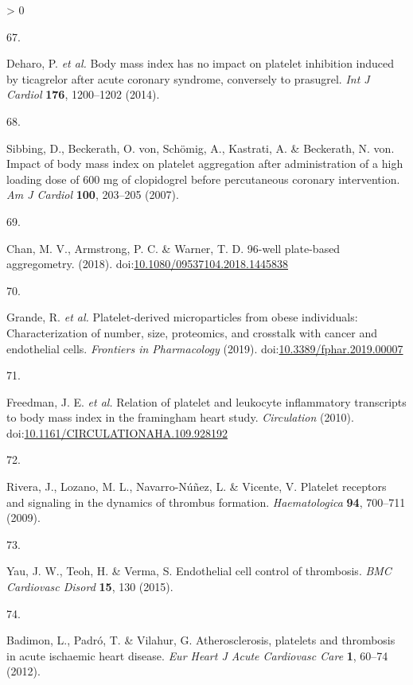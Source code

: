 \documentclass[11pt,twoside]{bristolthesis}
\newlength{\cslhangindent}
\newlength{\csllabelwidth}
\newenvironment{CSLReferences}[2] %
 {%
  \setlength{\parindent}{0pt}
  \ifodd #1 \everypar{\setlength{\hangindent}{\cslhangindent}}\ignorespaces\fi
  \ifnum #2 > 0
  \setlength{\parskip}{#2\baselineskip}
  \fi
 }%
 {}
\newcommand{\CSLLeftMargin}[1]{\parbox[t]{\csllabelwidth}{#1}}
\newcommand{\CSLRightInline}[1]{\parbox[t]{\linewidth - \csllabelwidth}{#1}\break}
\begin{document}
\begin{CSLReferences}{0}{0}
\leavevmode\hypertarget{ref-Deharo2014}{}%
\CSLLeftMargin{67. }
\CSLRightInline{Deharo, P. \emph{et al.} {Body mass index has no impact on platelet inhibition induced by ticagrelor after acute coronary syndrome, conversely to prasugrel}. \emph{Int J Cardiol} \textbf{176}, 1200--1202 (2014).}

\leavevmode\hypertarget{ref-Sibbing2007}{}%
\CSLLeftMargin{68. }
\CSLRightInline{Sibbing, D., Beckerath, O. von, Schömig, A., Kastrati, A. \& Beckerath, N. von. {Impact of body mass index on platelet aggregation after administration of a high loading dose of 600 mg of clopidogrel before percutaneous coronary intervention}. \emph{Am J Cardiol} \textbf{100}, 203--205 (2007).}

\leavevmode\hypertarget{ref-Chan2018}{}%
\CSLLeftMargin{69. }
\CSLRightInline{Chan, M. V., Armstrong, P. C. \& Warner, T. D. 96-well plate-based aggregometry. (2018). doi:\href{https://doi.org/10.1080/09537104.2018.1445838}{10.1080/09537104.2018.1445838}}

\leavevmode\hypertarget{ref-Grande2019}{}%
\CSLLeftMargin{70. }
\CSLRightInline{Grande, R. \emph{et al.} {Platelet-derived microparticles from obese individuals: Characterization of number, size, proteomics, and crosstalk with cancer and endothelial cells}. \emph{Frontiers in Pharmacology} (2019). doi:\href{https://doi.org/10.3389/fphar.2019.00007}{10.3389/fphar.2019.00007}}

\leavevmode\hypertarget{ref-Freedman2010}{}%
\CSLLeftMargin{71. }
\CSLRightInline{Freedman, J. E. \emph{et al.} {Relation of platelet and leukocyte inflammatory transcripts to body mass index in the framingham heart study}. \emph{Circulation} (2010). doi:\href{https://doi.org/10.1161/CIRCULATIONAHA.109.928192}{10.1161/CIRCULATIONAHA.109.928192}}

\leavevmode\hypertarget{ref-Rivera2009}{}%
\CSLLeftMargin{72. }
\CSLRightInline{Rivera, J., Lozano, M. L., Navarro-Núñez, L. \& Vicente, V. {Platelet receptors and signaling in the dynamics of thrombus formation}. \emph{Haematologica} \textbf{94}, 700--711 (2009).}

\leavevmode\hypertarget{ref-Yau2015}{}%
\CSLLeftMargin{73. }
\CSLRightInline{Yau, J. W., Teoh, H. \& Verma, S. {Endothelial cell control of thrombosis}. \emph{BMC Cardiovasc Disord} \textbf{15}, 130 (2015).}

\leavevmode\hypertarget{ref-Badimon2012}{}%
\CSLLeftMargin{74. }
\CSLRightInline{Badimon, L., Padró, T. \& Vilahur, G. {Atherosclerosis, platelets and thrombosis in acute ischaemic heart disease}. \emph{Eur Heart J Acute Cardiovasc Care} \textbf{1}, 60--74 (2012).}


\end{CSLReferences}
\end{document}
